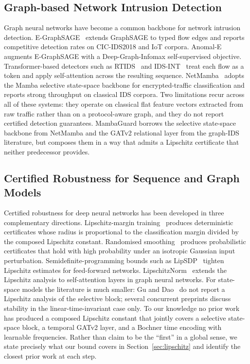 \documentclass{ieeeaccess}
\begin{document}
\subsection{Graph-based Network Intrusion Detection}
Graph neural networks have become a common backbone for network intrusion detection. E-GraphSAGE~\cite{Lo2022EGraphSAGE} extends GraphSAGE to typed flow edges and reports competitive detection rates on CIC-IDS2018 and IoT corpora. Anomal-E~\cite{Caville2022AnomalE} augments E-GraphSAGE with a Deep-Graph-Infomax self-supervised objective. Transformer-based detectors such as RTIDS~\cite{Wu2022RTIDS} and IDS-INT~\cite{Ullah2024IDSINT} treat each flow as a token and apply self-attention across the resulting sequence. NetMamba~\cite{Wang2025NetMamba} adopts the Mamba selective state-space backbone for encrypted-traffic classification and reports strong throughput on classical IDS corpora. Two limitations recur across all of these systems: they operate on classical flat feature vectors extracted from raw traffic rather than on a protocol-aware graph, and they do not report certified detection guarantees. MambaGuard borrows the selective state-space backbone from NetMamba and the GATv2 relational layer from the graph-IDS literature, but composes them in a way that admits a Lipschitz certificate that neither predecessor provides.

\subsection{Certified Robustness for Sequence and Graph Models}
Certified robustness for deep neural networks has been developed in three complementary directions. Lipschitz-margin training~\cite{Tsuzuku2018LipMargin} produces deterministic certificates whose radius is proportional to the classification margin divided by the composed Lipschitz constant. Randomised smoothing~\cite{Cohen2019RandSmooth} produces probabilistic certificates that hold with high probability under an isotropic Gaussian input perturbation. Semidefinite-programming bounds such as LipSDP~\cite{Fazlyab2019LipSDP} tighten Lipschitz estimates for feed-forward networks. LipschitzNorm~\cite{Dasoulas2021LipNorm} extends the Lipschitz analysis to self-attention layers in graph neural networks. For state-space models the literature is much smaller: Gu and Dao~\cite{Gu2023Mamba} do not report a Lipschitz analysis of the selective block; several concurrent preprints discuss stability in the linear-time-invariant case only. To our knowledge no prior work has produced a composed Lipschitz constant that jointly covers a selective state-space block, a temporal GATv2 layer, and a Bochner time encoding with learnable frequencies. Rather than claim to be the ``first'' in a global sense, we state precisely what our bound covers in Section~\ref{sec:lipschitz} and identify the closest prior work at each step.
\end{document}
